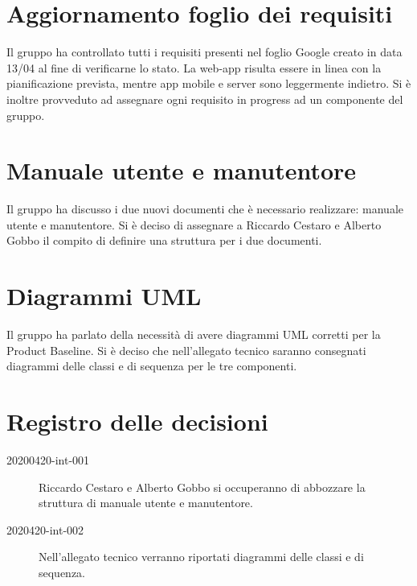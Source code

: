 \documentclass{article}
\begin{document}
\section{Aggiornamento foglio dei requisiti}%
\label{sec:aggiornamento_foglio_dei_requisiti}

Il gruppo ha controllato tutti i requisiti presenti nel foglio Google creato in data 13/04 al fine di verificarne lo stato.
La web-app risulta essere in linea con la pianificazione prevista, mentre app mobile e server sono leggermente indietro.
Si è inoltre provveduto ad assegnare ogni requisito in progress ad un componente del gruppo.

\section{Manuale utente e manutentore}%
\label{sec:manuale_utente_e_manutentore}

Il gruppo ha discusso i due nuovi documenti che è necessario realizzare: manuale utente e manutentore.
Si è deciso di assegnare a Riccardo Cestaro e Alberto Gobbo il compito di definire una struttura per i due documenti.

\section{Diagrammi UML}%
\label{sec:diagrammi_uml}

Il gruppo ha parlato della necessità di avere diagrammi UML corretti per la Product Baseline.
Si è deciso che nell'allegato tecnico saranno consegnati diagrammi delle classi e di sequenza per le tre componenti.

\newpage
\section{Registro delle decisioni}%
\label{sec:registro_delle_decisioni}

\begin{description}
  \item [20200420-int-001] Riccardo Cestaro e Alberto Gobbo si occuperanno di abbozzare la struttura di manuale utente e manutentore.
  \item [2020420-int-002] Nell'allegato tecnico verranno riportati diagrammi delle classi e di sequenza.
\end{description}
\end{document}
